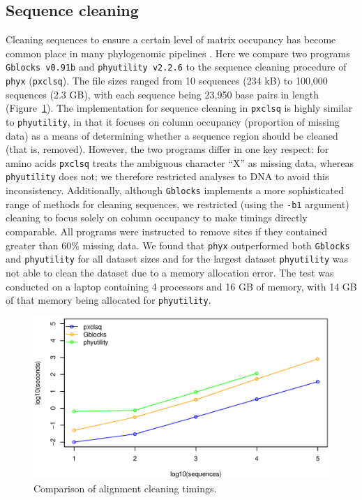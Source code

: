 \documentclass{article}
\begin{document}
\subsection{Sequence cleaning}
Cleaning sequences to ensure a certain level of matrix occupancy has become common place in many phylogenomic pipelines \citep{Dunn2013,YangSmith2014}. Here we compare two programs \texttt{Gblocks v0.91b} \citep{Gblocks} and \texttt{phyutility v2.2.6} \citep{SmithDunn2008} to the sequence cleaning procedure of \texttt{phyx} (\texttt{pxclsq}). The file sizes ranged from 10 sequences (234 kB) to 100,000 sequences (2.3 GB), with each sequence being 23,950 base pairs in length (Figure~\ref{fig:S1}). The implementation for sequence cleaning in \texttt{pxclsq} is highly similar to \texttt{phyutility}, in that it focuses on column occupancy (proportion of missing data) as a means of determining whether a sequence region should be cleaned (that is, removed). However, the two programs differ in one key respect: for amino acids \texttt{pxclsq} treats the ambiguous character ``X'' as missing data, whereas \texttt{phyutility} does not; we therefore restricted analyses to DNA to avoid this inconsistency. Additionally, although \texttt{Gblocks} implements a more sophisticated range of methods for cleaning sequences, we restricted (using the \texttt{-b1} argument) cleaning to focus solely on column occupancy to make timings directly comparable. All programs were instructed to remove sites if they contained greater than 60\% missing data. We found that \texttt{phyx} outperformed both \texttt{Gblocks} and \texttt{phyutility} for all dataset sizes and for the largest dataset \texttt{phyutility} was not able to clean the dataset due to a memory allocation error. The test was conducted on a laptop  containing 4 processors and 16 GB of memory, with 14 GB of that memory being allocated for \texttt{phyutility}.

\begin{figure}[H]
    \centering
    \includegraphics[width=5.0in]{clsq.eps}
    \caption{Comparison of alignment cleaning timings.}
    \label{cleaningfigure}
\label{fig:S1}
\end{figure}
\end{document}
